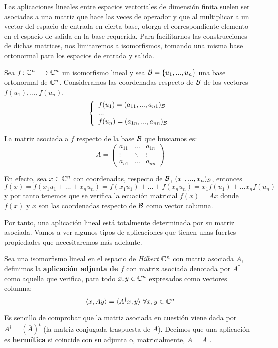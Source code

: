 Las aplicaciones lineales entre espacios vectoriales de dimensión finita suelen ser asociadas a una matriz que hace las veces de operador y que al multiplicar a un vector del espacio de entrada en cierta base, otorga el correspondiente elemento en el espacio de salida en la base requerida. Para facilitarnos las construcciones de dichas matrices, nos limitaremos a isomorfismos, tomando una misma base ortonormal para los espacios de entrada y salida.

Sea $f\colon \mathbb{C}^n\longrightarrow \mathbb{C}^n$ un isomorfismo lineal y sea $\mathcal{B}=\{u_1,...,u_n\}$ una base ortonormal de $\mathbb{C}^n$. Consideramos las coordenadas respecto de $\mathcal{B}$ de los vectores $f(u_1),...,f(u_n)$.
\[\left\{ \begin{array}{ll} f(u_1)=(a_{11},...,a_{n1})_{\mathcal{B}} \\...\\f(u_n)=(a_{1n},...,a_{nn})_{\mathcal{B}} \\ \end{array} \right.\]

La matriz asociada a $f$ respecto de la base $\mathcal{B}$ que buscamos es:
\[A=\left(\begin{matrix} a_{11}&\hdots&a_{1n}\\ \vdots&\ddots&\vdots\\ a_{n1}&\hdots&a_{nn} \end{matrix}\right)\]

En efecto, sea $x\in \mathbb{C}^n$ con coordenadas, respecto de $\mathcal{B}$, $(x_1,...,x_n)_{\mathcal{B}}$, entonces\newline $f(x)=f(x_1u_1+\hdots+x_nu_n)=f(x_1u_1)+\hdots+f(x_nu_n)=x_1f(u_1)+\hdots x_nf(u_n)$ y por tanto tenemos que se verifica la ecuación matricial $f(x)=Ax$ donde $f(x)$ y $x$ son las coordenadas respecto de $\mathcal{B}$ como vector columna.

Por tanto, una aplicación lineal está totalmente determinada por su matriz asociada. Vamos a ver algunos tipos de aplicaciones que tienen unas fuertes propiedades que necesitaremos más adelante.

\begin{definition} Sea una isomorfismo lineal en el espacio de \textit{Hilbert} $\mathbb{C}^n$ con matriz asociada $A$, definimos la \textbf{aplicación adjunta de $f$} con matriz asociada denotada por $A^\dag$ como aquella que verifica, para todo $x,y\in\mathbb{C}^n$ expresados como vectores columna:
\begin{equation}
\dotproduct{x}{Ay}=\dotproduct{A^\dag x}{y}\ \forall x,y\in\C^n
\end{equation}

Es sencillo de comprobar que la matriz asociada en cuestión viene dada por $A^\dag=(\overline{A})^t$ (la matriz conjugada traspuesta de $A$). Decimos que una aplicación es \textbf{hermítica} si coincide con su adjunta o, matricialmente, $A=A^\dag$.
\end{definition}

